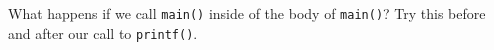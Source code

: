 %
What happens if we call \texttt{main()} inside of the body of
\texttt{main()}?  Try this before and after our call to
\texttt{printf()}.
